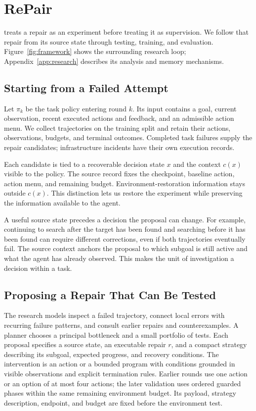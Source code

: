 \section{RePair}
\label{sec:method}

\method{} treats a repair as an experiment before treating it as supervision.
We follow that repair from its source state through testing, training, and
evaluation. Figure~\ref{fig:framework} shows the surrounding research loop;
Appendix~\ref{app:research} describes its analysis and memory mechanisms.

\subsection{Starting from a Failed Attempt}
\label{sec:setup-formal}
Let $\pi_k$ be the task policy entering round $k$. Its input contains a goal,
current observation, recent executed actions and feedback, and an admissible
action menu. We collect trajectories on the training split and retain their
actions, observations, budgets, and terminal outcomes. Completed task failures
supply the repair candidates; infrastructure incidents have their own
execution records.

Each candidate is tied to a recoverable decision state $x$ and the context
$c(x)$ visible to the policy. The source record fixes the checkpoint,
baseline action, action menu, and remaining budget. Environment-restoration
information stays outside $c(x)$. This distinction lets us restore the
experiment while preserving the information available to the agent.

A useful source state precedes a decision the proposal can change. For
example, continuing to search after the target has been found and searching
before it has been found can require different corrections, even if both
trajectories eventually fail. The source context anchors the proposal to
which subgoal is still active and what the agent has already observed.
This makes the unit of investigation a decision within a task.

\subsection{Proposing a Repair That Can Be Tested}
\label{sec:proposal}
The research models inspect a failed trajectory, connect local errors with
recurring failure patterns, and consult earlier repairs and counterexamples.
A planner chooses a principal bottleneck and a small portfolio of tests.
Each proposal specifies a source state, an executable repair $r$, and a
compact strategy describing its subgoal, expected progress, and recovery
conditions. The intervention is an action or a bounded program with conditions
grounded in visible observations and explicit termination rules. Earlier rounds use one action or an
option of at most four actions; the later validation uses ordered guarded
phases within the same remaining environment budget. Its payload, strategy description,
endpoint, and budget are fixed before the environment test.


